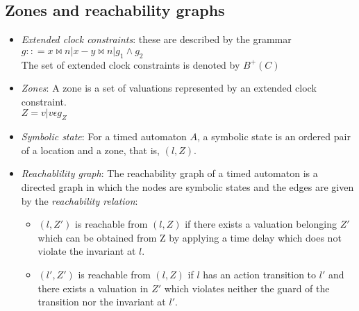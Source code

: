 \documentclass{article}
\begin{document}
\subsection{Zones and reachability graphs}
\begin{itemize}
\item \emph{Extended clock constraints}: these are described by the
  grammar\\
  $g :: = x \bowtie n | x - y \bowtie n | g_1 \wedge g_2$\\
  The set of extended clock constraints is denoted by $B^+(C)$
\item \emph{Zones}: A zone is a set of valuations represented by an
  extended clock constraint.\\
  $Z = {v|v \epsilon g_Z}$
\item \emph{Symbolic state}: For a timed automaton $A$, a symbolic
  state is an ordered pair of a location and a zone, that is, $(l,
  Z)$.
\item \emph{Reachablility graph}: The reachability graph of a timed
  automaton is a directed graph in which the nodes are symbolic states
  and the edges are given by the \emph{reachability relation}: 
  \begin{itemize}
    \item $(l,Z')$ is reachable from $(l,Z)$ if there exists a
      valuation belonging $Z'$ which can be obtained
      from Z by applying a time delay which does not violate the
      invariant at $l$.

    \item $(l', Z')$ is reachable from $(l, Z)$ if $l$ has an action
      transition to $l'$ and there exists a valuation in $Z'$ which
      violates neither the guard of the
      transition nor the invariant at $l'$.
  \end{itemize}
\end{itemize}
\end{document}
